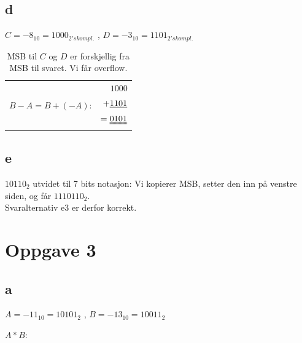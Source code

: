 \documentclass[12pt,norsk,a4paper]{article}
\begin{document}
\subsection{d}
$C = -8_{10} = 1000_{2's kompl.}$ \hspace{1cm}, \hspace{1cm} $D=-3_{10} = 1101_{2's kompl.}$

\begin{table}[H]
    \begin{tabular}{cr}
    \multirow{3}{*}{$B-A = B+(-A)$: } & $  1000$\\
                                     & $+ \uline{1101}$\\
                                     & $= \uuline{0101}$
    \end{tabular}
    \caption{MSB til $C$ og $D$ er forskjellig fra MSB til svaret. Vi får overflow.}
\end{table}

\subsection{e}

$10110_{2}$ utvidet til 7 bits notasjon: Vi kopierer MSB, setter den inn på venstre siden, og får $1110110_2$. \\
Svaralternativ e3 er derfor korrekt. 

\clearpage
\section{Oppgave 3}
\subsection{a}
$A = -11_{10} = 10101_2$ \hspace{1cm},\hspace{1cm} $B = -13_{10} = 10011_2$

$A*B:$
    
\end{document}

